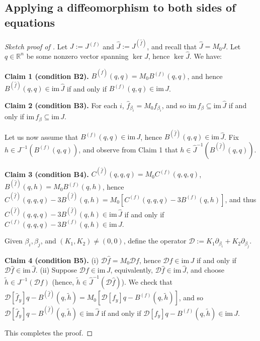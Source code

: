 \documentclass[11pt]{amsart}
\newcommand{\R}{\mathbb{R}}
\newcommand{\wJ}{\hat{J}}
\newcommand{\mD}{\mathcal{D}}
\theoremstyle{definition}
\begin{document}
\subsection{Applying a diffeomorphism to both sides of equations} 

\begin{proof}[Sketch proof of ]
Let $J:=J^{(f)}$ and $\wJ:=J^{(\hat{f})}$, and recall that $\wJ = M_0J$. Let $q \in \R^n$ be some nonzero vector spanning $\ker J$, hence $\ker \wJ$. We have:

{\bf Claim 1 (condition B2).} $B^{(\hat{f})}(q, q) = M_0 B^{(f)}(q, q)$, and hence $B^{(\hat{f})}(q, q) \in \mathrm{im}\,\wJ$ if and only if $B^{(f)}(q, q) \in \mathrm{im}\,J$. 

{\bf Claim 2 (condition B3).} For each $i$, $\hat{f}_{\beta_i} = M_0 f_{\beta_i}$, and so $\mathrm{im}\,\hat{f}_\beta \subseteq \mathrm{im}\,\wJ$ if and only if $\mathrm{im}\,f_\beta \subseteq \mathrm{im}\,J$. 

Let us now assume that $B^{(f)}(q, q) \in \mathrm{im}\,J$, hence $B^{(\hat{f})}(q, q) \in \mathrm{im}\,\wJ$. Fix $h \in J^{-1}(B^{(f)}(q,q))$, and observe from Claim 1 that $h \in \wJ^{-1}(B^{(\hat{f})}(q,q))$. 

{\bf Claim 3 (condition B4).} $C^{(\hat{f})}(q,q,q) =  M_0C^{(f)}(q,q,q)$, $B^{(\hat{f})}(q,h) =  M_0B^{(f)}(q, h)$, hence $C^{(\hat{f})}(q,q,q) - 3B^{(\hat{f})}(q,h) =  M_0\left[C^{(f)}(q,q,q) -3B^{(f)}(q, h)\right]$, and thus $C^{(\hat{f})}(q,q,q) - 3B^{(\hat{f})}(q,h) \in \mathrm{im}\,\wJ$ if and only if $C^{(f)}(q,q,q) -3B^{(f)}(q, h) \in \mathrm{im}\,J$. 

Given $\beta_i, \beta_j$, and $(K_1,K_2) \neq (0,0)$, define the operator $\mathcal{D}:= K_1\partial_{\beta_i} + K_2 \partial_{\beta_j}$. 

{\bf Claim 4 (condition B5).} (i) $\mathcal{D} \hat{f} = M_0\mathcal{D} f$, hence $\mD f \in \mathrm{im}\,J$ if and only if $\mD \hat{f} \in \mathrm{im}\,\wJ$. (ii) Suppose $\mD f \in \mathrm{im}\,J$, equivalently, $\mD \hat{f} \in \mathrm{im}\,\wJ$, and choose $\tilde{h} \in J^{-1}(\mathcal{D} f)$ (hence, $\tilde{h} \in \wJ^{-1}(\mathcal{D} \hat{f})$). We check that $\mathcal{D}[\hat{f}_y] q - B^{(\hat{f})}(q,\tilde{h}) = M_0[\mathcal{D}[f_y] q - B^{(f)}(q,\tilde{h})]$, and so $\mathcal{D}[\hat{f}_y] q - B^{(\hat{f})}(q,\tilde{h}) \in\mathrm{im}\,\wJ$ if and only if $\mathcal{D}[f_y] q - B^{(f)}(q,\tilde{h}) \in \mathrm{im}\,J$. 

This completes the proof.
\end{proof}
\end{document}
